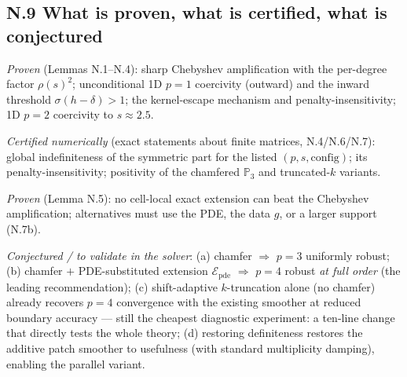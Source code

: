 \subsection*{N.9 What is proven, what is certified, what is conjectured}

\emph{Proven} (Lemmas N.1--N.4): sharp Chebyshev amplification with the
per-degree factor $\rho(s)^2$; unconditional 1D $p=1$ coercivity (outward)
and the inward threshold $\sigma(h-\delta) > 1$; the kernel-escape
mechanism and penalty-insensitivity; 1D $p=2$ coercivity to $s\approx2.5$.

\emph{Certified numerically} (exact statements about finite matrices,
N.4/N.6/N.7): global indefiniteness of the symmetric part for the listed
$(p, s, \text{config})$; its penalty-insensitivity; positivity of the
chamfered $\mathbb P_3$ and truncated-$k$ variants.

\emph{Proven} (Lemma N.5): no cell-local exact extension can beat the
Chebyshev amplification; alternatives must use the PDE, the data $g$, or a
larger support (N.7b).

\emph{Conjectured / to validate in the solver}: (a) chamfer $\Rightarrow$
$p=3$ uniformly robust; (b) chamfer $+$ PDE-substituted extension
$\mathcal E_{\mathrm{pde}}$ $\Rightarrow$ $p=4$ robust \emph{at full
order} (the leading recommendation); (c) shift-adaptive $k$-truncation
alone (no chamfer) already recovers $p=4$ convergence with the existing
smoother at reduced boundary accuracy --- still the cheapest diagnostic
experiment: a ten-line change that directly tests the whole theory;
(d) restoring definiteness restores the additive patch smoother to
usefulness (with standard multiplicity damping), enabling the parallel
variant.

